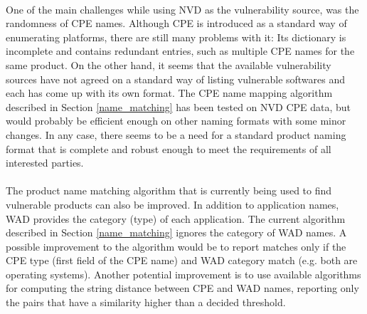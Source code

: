 \paragraph{}
One of the main challenges while using NVD as the vulnerability source, was the randomness of CPE names. Although CPE is introduced as a standard way of enumerating platforms, there are still many problems with it: Its dictionary is incomplete and contains redundant entries, such as multiple CPE names for the same product. On the other hand, it seems that the available vulnerability sources have not agreed on a standard way of listing vulnerable softwares and each has come up with its own format. The CPE name mapping algorithm described in Section \ref{name_matching} has been tested on NVD CPE data, but would probably be efficient enough on other naming formats with some minor changes. In any case, there seems to be a need for a standard product naming format that is complete and robust enough to meet the requirements of all interested parties. 

\paragraph{}
The product name matching algorithm that is currently being used to find vulnerable products can also be improved. In addition to application names, WAD provides the category (type) of each application. The current algorithm described in Section \ref{name_matching} ignores the category of WAD names. A possible improvement to the algorithm would be to report matches only if the CPE type (first field of the CPE name) and WAD category match (e.g. both are operating systems). Another potential improvement is to use available algorithms for computing the string distance between CPE and WAD names, reporting only the pairs that have a similarity higher than a decided threshold.  

